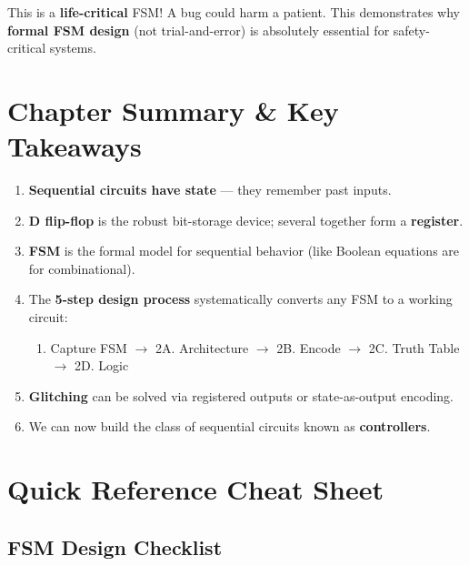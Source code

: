 \documentclass[12pt, a4paper]{article}
\begin{document}
\begin{important}
  This is a \textbf{life-critical} FSM! A bug could harm a patient. This demonstrates why \textbf{formal FSM design} (not trial-and-error) is absolutely essential for safety-critical systems.
\end{important}

\section{Chapter Summary \& Key Takeaways}

\begin{keypoint}
  \begin{enumerate}[leftmargin=*]
    \item \textbf{Sequential circuits have state} --- they remember past inputs.
    \item \textbf{D flip-flop} is the robust bit-storage device; several together form a \textbf{register}.
    \item \textbf{FSM} is the formal model for sequential behavior (like Boolean equations are for combinational).
    \item The \textbf{5-step design process} systematically converts any FSM to a working circuit:
    \begin{enumerate}
      \item Capture FSM $\to$ 2A. Architecture $\to$ 2B. Encode $\to$ 2C. Truth Table $\to$ 2D. Logic
    \end{enumerate}
    \item \textbf{Glitching} can be solved via registered outputs or state-as-output encoding.
    \item We can now build the class of sequential circuits known as \textbf{controllers}.
  \end{enumerate}
\end{keypoint}

\section{Quick Reference Cheat Sheet}

\subsection{FSM Design Checklist}
\end{document}
